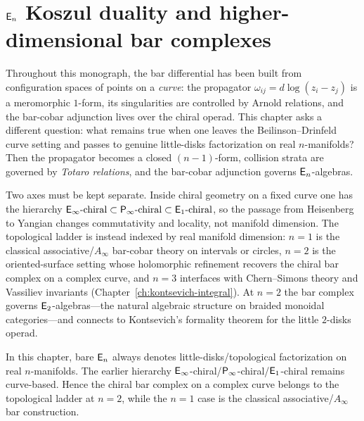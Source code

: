 \chapter{\texorpdfstring{$\mathsf{E}_n$ Koszul duality and higher-dimensional bar complexes}{En Koszul duality and higher-dimensional bar complexes}}
\label{ch:en-koszul-duality}


Throughout this monograph, the bar differential has been built from
configuration spaces of points on a \emph{curve}: the propagator
$\omega_{ij} = d\log(z_i - z_j)$ is a meromorphic $1$-form, its
singularities are controlled by Arnold relations, and the bar-cobar
adjunction lives over the chiral operad.  This chapter asks a
different question: what remains true when one leaves the
Beilinson--Drinfeld curve setting and passes to genuine little-disks
factorization on real $n$-manifolds?  Then the propagator becomes a
closed $(n-1)$-form, collision strata are governed by
\emph{Totaro relations}, and the bar-cobar adjunction governs
$\mathsf{E}_n$-algebras.

Two axes must be kept separate.  Inside chiral geometry on a fixed
curve one has the hierarchy
$\mathsf{E}_{\infty}\text{-chiral} \subset \mathsf{P}_{\infty}\text{-chiral} \subset \mathsf{E}_1\text{-chiral}$,
so the passage from Heisenberg to Yangian changes commutativity and
locality, not manifold dimension.  The topological ladder is instead
indexed by real manifold dimension: $n = 1$ is the classical
associative/$A_\infty$ bar-cobar theory on intervals or circles,
$n = 2$ is the oriented-surface setting whose holomorphic refinement
recovers the chiral bar complex on a complex curve, and $n = 3$
interfaces with Chern--Simons theory and Vassiliev invariants
(Chapter~\ref{ch:kontsevich-integral}).  At $n = 2$ the bar complex
governs $\mathsf{E}_2$-algebras---the natural algebraic structure on braided
monoidal categories---and connects to Kontsevich's formality theorem
for the little $2$-disks operad.

\begin{convention}
\label{conv:en-two-axes}
In this chapter, bare $\mathsf{E}_n$ always denotes little-disks/topological
factorization on real $n$-manifolds.  The earlier hierarchy
$\mathsf{E}_{\infty}$-chiral/$\mathsf{P}_{\infty}$-chiral/$\mathsf{E}_1$-chiral remains curve-based.
Hence the chiral bar complex on a complex curve belongs to the
topological ladder at $n = 2$, while the $n = 1$ case is the
classical associative/$A_\infty$ bar construction.
\end{convention}


